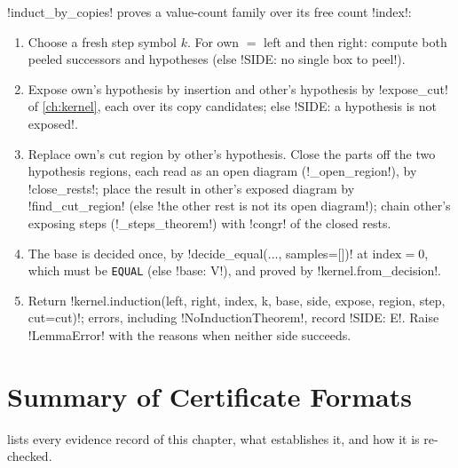 \begin{algorithm}\label{alg:proofs-induct-copies}
\py!induct_by_copies! proves a value-count family over its free count \py!index!:
\begin{enumerate}
\item Choose a fresh step symbol $k$. For own $=$ left and then right: compute both peeled successors and hypotheses (else \code!SIDE: no single box to peel!).
\item Expose own's hypothesis by insertion and other's hypothesis by \py!expose_cut! of \cref{ch:kernel}, each over its copy candidates; else \code!SIDE: a hypothesis is not exposed!.
\item Replace own's cut region by other's hypothesis. Close the parts off the two hypothesis regions, each read as an open diagram (\py!_open_region!), by \py!close_rests!; place the result in other's exposed diagram by \py!find_cut_region! (else \code!the other rest is not its open diagram!); chain other's exposing steps (\py!_steps_theorem!) with \py!congr! of the closed rests.
\item The base is decided once, by \py!decide_equal(..., samples=[])! at $\text{index}=0$, which must be \texttt{EQUAL} (else \code!base: V!), and proved by \py!kernel.from_decision!.
\item Return \py!kernel.induction(left, right, index, k, base, side, expose, region, step, cut=cut)!; errors, including \py!NoInductionTheorem!, record \code!SIDE: E!. Raise \py!LemmaError! with the reasons when neither side succeeds.
\end{enumerate}
\end{algorithm}

\section{Summary of Certificate Formats}\label{sec:proofs-formats}

 lists every evidence record of this chapter, what establishes it, and how it is re-checked.

